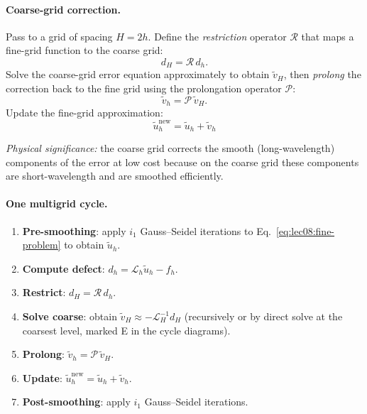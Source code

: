 \paragraph{Coarse-grid correction.}
Pass to a grid of spacing $H=2h$.  Define the \emph{restriction}
operator $\mathcal{R}$ that maps a fine-grid function to the coarse grid:
\begin{equation}
  d_H = \mathcal{R}\,d_h.
  \label{eq:lec08:restriction}
\end{equation}
Solve the coarse-grid error equation approximately to obtain
$\tilde{v}_H$, then \emph{prolong} the correction back to the fine
grid using the prolongation operator $\mathcal{P}$:
\begin{equation}
  \tilde{v}_h = \mathcal{P}\,\tilde{v}_H.
  \label{eq:lec08:prolongation}
\end{equation}
Update the fine-grid approximation:
\begin{equation}
  \boxed{\tilde{u}_h^{\mathrm{new}} = \tilde{u}_h + \tilde{v}_h}
  \label{eq:lec08:update}
\end{equation}

\textit{Physical significance:} the coarse grid corrects the
smooth (long-wavelength) components of the error at low cost because
on the coarse grid these components are short-wavelength and are
smoothed efficiently.

\paragraph{One multigrid cycle.}
\begin{enumerate}
  \item \textbf{Pre-smoothing}: apply $i_1$ Gauss–Seidel iterations
    to Eq.~\eqref{eq:lec08:fine-problem} to obtain $\tilde{u}_h$.
  \item \textbf{Compute defect}: $d_h = \mathcal{L}_h\tilde{u}_h - f_h$.
  \item \textbf{Restrict}: $d_H = \mathcal{R}\,d_h$.
  \item \textbf{Solve coarse}: obtain $\tilde{v}_H\approx -\mathcal{L}_H^{-1}d_H$
    (recursively or by direct solve at the coarsest level, marked
    E in the cycle diagrams).
  \item \textbf{Prolong}: $\tilde{v}_h = \mathcal{P}\,\tilde{v}_H$.
  \item \textbf{Update}: $\tilde{u}_h^{\mathrm{new}}=\tilde{u}_h+\tilde{v}_h$.
  \item \textbf{Post-smoothing}: apply $i_1$ Gauss–Seidel iterations.
\end{enumerate}

